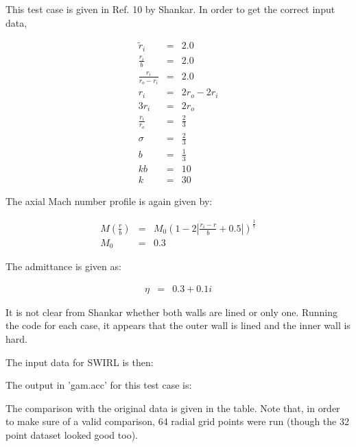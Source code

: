 This test case is given in Ref. 10 by Shankar.   In order to
get the correct input data,

\begin{eqnarray}
\widetilde{r}_i  
&=& 2.0
\nonumber
\\
\frac{r_i}{b}
&=& 2.0
\nonumber
\\
\frac{r_i}{r_o - r_i}
&=& 2.0
\nonumber
\\
r_i
&=& 2 r_o - 2 r_i
\nonumber
\\
3 r_i
&=& 2 r_o 
\nonumber
\\
\frac{r_i}{r_o}
&=& \frac{2}{3} 
\nonumber
\\
\sigma &=& \frac{2}{3}
\nonumber
\\
b &=& \frac{1}{3}
\nonumber
\\
k b &=& 10
\nonumber
\\
k &=& 30
\nonumber
\end{eqnarray}

The axial Mach number profile is again given by:

\begin{eqnarray}
M \left(\frac{r}{b} \right)
&=&
M_0 \left(1 - 2 \left| \frac{r_i - r}{b} + 0.5 \right| \right)^{\frac{1}{7}}
\nonumber
\\
M_0 &=& 0.3
\nonumber
\end{eqnarray}

The admittance is given as:

\begin{eqnarray}
\eta &=& 0.3 + 0.1 i
\nonumber
\end{eqnarray}


It is not clear from Shankar whether both walls are lined or only one.
Running the code for each case, it appears that the outer wall is lined
and the inner wall is hard.

The input data for SWIRL is then:

\begin{tiny}
\end{tiny}%

The output in 'gam.acc' for this test case is:

\begin{tiny}
\end{tiny}%

The comparison with the original data is given in the table.  Note that, in order to
make sure of a valid comparison, 64 radial grid points were run (though the 32 point
dataset looked good too).

